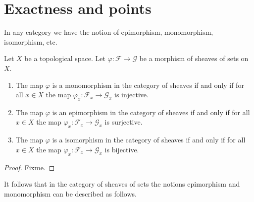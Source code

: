 \section{Exactness and points}
\label{section-exactness-points}

\noindent
In any category we have the notion of epimorphism, monomorphism,
isomorphism, etc.

\begin{lemma}
\label{lemma-points-exactness}
Let $X$ be a topological space. Let $\varphi : \mathcal{F} \to \mathcal{G}$
be a morphism of sheaves of sets on $X$.
\begin{enumerate}
\item The map $\varphi$ is a monomorphism in the category of sheaves
if and only if for all $x \in X$ the map
$\varphi_x : \mathcal{F}_x \to \mathcal{G}_x$
is injective.
\item The map $\varphi$ is an epimorphism in the category of sheaves
if and only if for all $x \in X$ the map
$\varphi_x : \mathcal{F}_x \to \mathcal{G}_x$
is surjective.
\item The map $\varphi$ is a isomorphism in the category of sheaves
if and only if for all $x \in X$ the map
$\varphi_x : \mathcal{F}_x \to \mathcal{G}_x$
is bijective.
\end{enumerate}
\end{lemma}

\begin{proof}
Fixme.
\end{proof}

\noindent
It follows that in the category of sheaves of sets
the notions epimorphism and monomorphism can be described
as follows.

